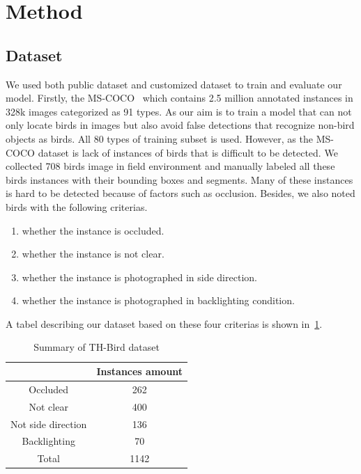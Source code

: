 \section{Method}
\subsection{Dataset}
We used both public dataset and customized dataset to train and evaluate our model.
Firstly, the MS-COCO~\cite{datasetcoco} which contains 2.5 million annotated 
instances in 328k images categorized as 91 types. As our aim is to train a model that 
can not only locate birds in images but also avoid false detections that recognize 
non-bird objects as birds. All 80 types of training subset is used. However, as 
the MS-COCO dataset is lack of instances of birds that is difficult to be detected.
We collected 708 birds image in field environment and manually labeled all these birds 
instances with their bounding boxes and segments. Many of these instances is hard to be
detected because of factors such as occlusion. Besides, we also noted birds with the 
following criterias.
\begin{enumerate}
    \item whether the instance is occluded.
    \item whether the instance is not clear.
    \item whether the instance is photographed in side direction.
    \item whether the instance is photographed in backlighting condition.
\end{enumerate}
A tabel describing our dataset based on these four criterias is shown in~\ref{th-bird-table}.
\begin{table}[H]
    \centering  %
    \captionsetup{justification=centering}  %
    \begin{tabular}{|c|c|}
    \hline
                       & Instances amount \\ \hline
    Occluded           & 262              \\ \hline
    Not clear          & 400              \\ \hline
    Not side direction & 136              \\ \hline
    Backlighting       & 70               \\ \hline
    Total              & 1142             \\ \hline
    \end{tabular}
    \caption{Summary of TH-Bird dataset}
    \label{th-bird-table}
\end{table}
